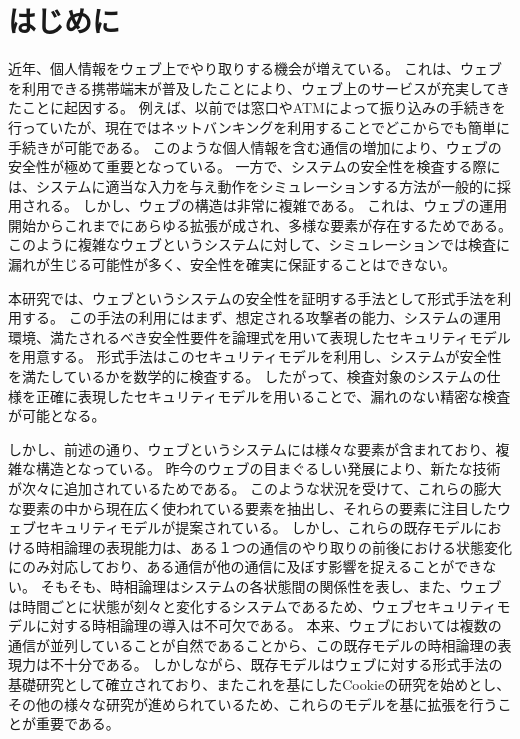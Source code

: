 \documentclass[12pt,a4paper]{jbook}
\begin{document}
\newpage

\chapter{はじめに}
\label{sec:introduction}
近年、個人情報をウェブ上でやり取りする機会が増えている。
これは、ウェブを利用できる携帯端末が普及したことにより、ウェブ上のサービスが充実してきたことに起因する。
例えば、以前では窓口やATMによって振り込みの手続きを行っていたが、現在ではネットバンキングを利用することでどこからでも簡単に手続きが可能である。
このような個人情報を含む通信の増加により、ウェブの安全性が極めて重要となっている。
一方で、システムの安全性を検査する際には、システムに適当な入力を与え動作をシミュレーションする方法が一般的に採用される。
しかし、ウェブの構造は非常に複雑である。
これは、ウェブの運用開始からこれまでにあらゆる拡張が成され、多様な要素が存在するためである。
このように複雑なウェブというシステムに対して、シミュレーションでは検査に漏れが生じる可能性が多く、安全性を確実に保証することはできない。

本研究では、ウェブというシステムの安全性を証明する手法として形式手法を利用する。
この手法の利用にはまず、想定される攻撃者の能力、システムの運用環境、満たされるべき安全性要件を論理式を用いて表現したセキュリティモデルを用意する。
形式手法はこのセキュリティモデルを利用し、システムが安全性を満たしているかを数学的に検査する。
したがって、検査対象のシステムの仕様を正確に表現したセキュリティモデルを用いることで、漏れのない精密な検査が可能となる。

しかし、前述の通り、ウェブというシステムには様々な要素が含まれており、複雑な構造となっている。
昨今のウェブの目まぐるしい発展により、新たな技術が次々に追加されているためである。
このような状況を受けて、これらの膨大な要素の中から現在広く使われている要素を抽出し、それらの要素に注目したウェブセキュリティモデルが提案されている\cite{based-model,cookie-model}。
しかし、これらの既存モデルにおける時相論理の表現能力は、ある１つの通信のやり取りの前後における状態変化にのみ対応しており、ある通信が他の通信に及ぼす影響を捉えることができない。
そもそも、時相論理はシステムの各状態間の関係性を表し、また、ウェブは時間ごとに状態が刻々と変化するシステムであるため、ウェブセキュリティモデルに対する時相論理の導入は不可欠である。
本来、ウェブにおいては複数の通信が並列していることが自然であることから、この既存モデルの時相論理の表現力は不十分である。
しかしながら、既存モデル\cite{based-model}はウェブに対する形式手法の基礎研究として確立されており、またこれを基にしたCookieの研究\cite{cookie-model}を始めとし、その他の様々な研究\cite{chaitanya2017formal, bagheri2016practical, chen2015aspire, nelson2013aluminum, somorovsky2011all}が進められているため、これらのモデルを基に拡張を行うことが重要である。
\end{document}
